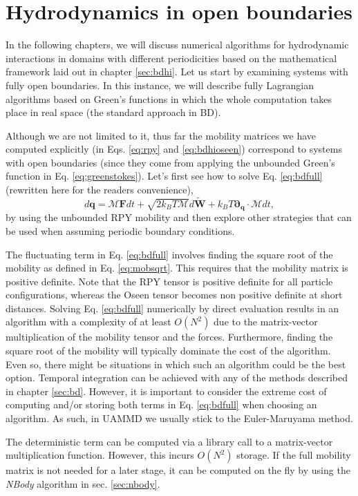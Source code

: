 \documentclass[twoside,openright,titlepage,numbers=noenddot,%
headinclude,footinclude,cleardoublepage=empty,abstract=on,
BCOR=5mm,fontsize=11pt, dvipsnames, paper=b5
]{scrreprt}
\renewcommand{\vec}[1]{\bm{#1}}
\newcommand{\tens}[1]{\bm{\mathcal{#1}}}
\newcommand{\uammd}{\gls{UAMMD}\xspace}
\newcommand{\kT}{k_B T}
\newcommand{\noise}{\widetilde{W}}
\newcommand{\ppos}{q}
\begin{document}
\chapter{Hydrodynamics in open boundaries}
In the following chapters, we will discuss numerical algorithms for hydrodynamic interactions in domains with different periodicities based on the mathematical framework laid out in chapter \ref{sec:bdhi}. Let us start by examining systems with fully open boundaries. In this instance, we will describe fully Lagrangian algorithms based on Green's functions in which the whole computation takes place in real space (the standard approach in \gls{BD}).

Although we are not limited to it, thus far the mobility matrices we have computed explicitly (in Eqs. \eqref{eq:rpy} and \eqref{eq:bdhioseen}) correspond to systems with open boundaries (since they come from applying the unbounded Green's function in Eq. \eqref{eq:greenstokes}). Let's first see how to solve Eq. \eqref{eq:bdfull} (rewritten here for the readers convenience),
$$  d\vec{\ppos} =\tens{M}\vec{F}dt + \sqrt{2\kT\tens{M}}d\vec{\noise} + \kT\vec{\partial}_{\vec{\ppos}}\cdot\tens{M}dt,$$
by using the unbounded \gls{RPY} mobility and then explore other strategies that can be used when assuming periodic boundary conditions.

The fluctuating term in Eq. \eqref{eq:bdfull} involves finding the square root of the mobility as defined in Eq. \eqref{eq:mobsqrt}.
This requires that the mobility matrix is positive definite. Note that the \gls{RPY} tensor is positive definite for all particle configurations, whereas the Oseen tensor becomes non positive definite at short distances.
Solving Eq. \eqref{eq:bdfull} numerically by direct evaluation results in an algorithm with a complexity of at least $O(N^2)$ due to the matrix-vector multiplication of the mobility tensor and the forces. Furthermore, finding the square root of the mobility will typically dominate the cost of the algorithm. Even so, there might be situations in which such an algorithm could be the best option.
Temporal integration can be achieved with any of the methods described in chapter \ref{sec:bd}. However, it is important to consider the extreme cost of computing and/or storing both terms in Eq. \eqref{eq:bdfull} when choosing an algorithm. As such, in \uammd we usually stick to the Euler-Maruyama method.

The deterministic term can be computed via a library call to a matrix-vector multiplication function. However, this incurs $O(N^2)$ storage. If the full mobility matrix is not needed for a later stage, it can be computed on the fly by using the \emph{NBody} algorithm in sec. \ref{sec:nbody}.
\end{document}
